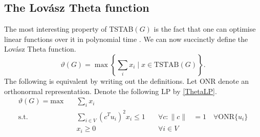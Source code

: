 \subsection{The Lov\'{a}sz Theta function}\label{subsec:Theta}

The most interesting property of TSTAB$(G)$ is the fact that one can optimise linear functions over it in polynomial time \cite[Theorem 9.3.30]{GLS}. %
We can now succinctly define the Lov\'{a}sz Theta function.
%
\begin{equation*}
\vartheta(G) = \max \left\{ \sum_i x_i \mid x \in \textrm{TSTAB}(G) \right\}.
\end{equation*}
%
The following is equivalent by writing out the definitions. Let ONR denote an orthonormal representation. Denote the following LP by \eqref{ThetaLP}.
%
\begin{equation}\tag{$\vartheta$-LP}\label{ThetaLP}
\begin{alignedat}{2}
\vartheta(G) = \text{max}  \quad & \sum_i x_i \ \\
               \text{s.t.} \quad & \sum_{i \in V} (c^T u_i)^2 x_i \leq 1 & \quad \forall c : \|c\| & = 1 \quad \forall \textrm{ONR}\{u_i\} \\
                                 & x_i \geq 0                            & \quad \forall i \in V
\end{alignedat}
\end{equation}
%
